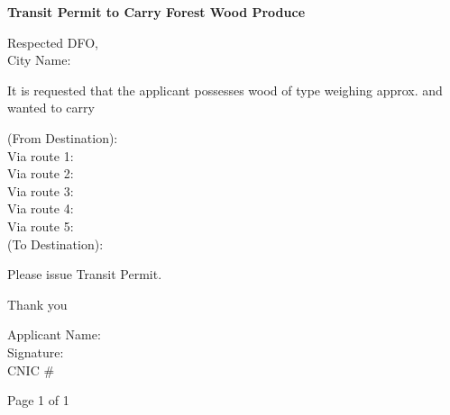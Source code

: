 \documentclass{article}
\begin{document}
\begin{center}
\textbf{\Large Transit Permit to Carry Forest Wood Produce}
\end{center}

\vspace{0.5cm}

Respected DFO, \\
City Name: \underline{\hspace{5cm}}

\vspace{0.5cm}

It is requested that the applicant possesses wood of type \underline{\hspace{5cm}} weighing approx. \underline{\hspace{3cm}} and wanted to carry \underline{\hspace{3cm}}

\vspace{0.5cm}

(From Destination): \underline{\hspace{5cm}} \\
Via route 1: \underline{\hspace{5cm}} \\
Via route 2: \underline{\hspace{5cm}} \\
Via route 3: \underline{\hspace{5cm}} \\
Via route 4: \underline{\hspace{5cm}} \\
Via route 5: \underline{\hspace{5cm}} \\
(To Destination): \underline{\hspace{5cm}}

\vspace{0.5cm}

Please issue Transit Permit.

\vspace{0.5cm}

Thank you

\vspace{0.5cm}

Applicant Name: \underline{\hspace{5cm}} \\
Signature: \underline{\hspace{5cm}} \\
CNIC \# \underline{\hspace{3cm}}

\vspace{1cm}

\begin{flushright}
Page 1 of 1
\end{flushright}
\end{document}
